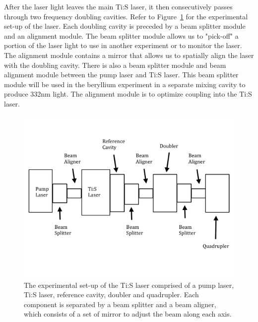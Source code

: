 \documentclass[prb,preprint]{revtex4-1}
\begin{document}
After the laser light leaves the main Ti:S laser, it then consecutively passes through two frequency doubling cavities. Refer to Figure~\ref{LaserSetup} for the experimental set-up of the laser.  Each doubling cavity is preceded by a beam splitter module and an alignment module.  The beam splitter module allows us to "pick-off" a portion of the laser light to use in another experiment or to monitor the laser.  The alignment module contains a mirror that allows us to spatially align the laser with the doubling cavity.  There is also a beam splitter module and beam alignment module between the pump laser and Ti:S laser.  This beam splitter module will be used in the beryllium experiment in a separate mixing cavity to produce 332nm light.  The alignment module is to optimize coupling into the Ti:S laser.

\begin{figure}[h!]
\centering
\includegraphics[width=6in]{LaserSetup.pdf}
\caption{The experimental set-up of the Ti:S laser comprised of a pump laser, Ti:S laser, reference cavity, doubler and quadrupler. Each component is separated by a beam splitter and a beam aligner, which consists of a set of mirror to adjust the beam along each axis.}
\label{LaserSetup}
\end{figure}
\end{document}
